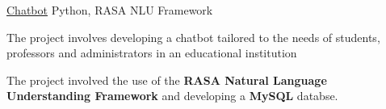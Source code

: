 

\begin{cventries}




  \projects
    {} %
    {\href{}{Chatbot}} %
    {Python, RASA NLU Framework} %
    {} %
    {
      \begin{cvitems} %
        \item {The project involves developing a chatbot tailored to the needs of students, professors and administrators in an educational institution}
        \item {The project involved the use of the \textbf{RASA Natural Language Understanding Framework} and developing a \textbf{MySQL} databse.}
      \end{cvitems}
    }


\end{cventries}
